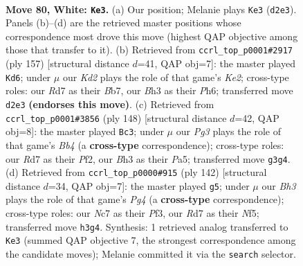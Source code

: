 \documentclass[11pt]{article}
\begin{document}
\clearpage

\begin{figure}[p]\centering
\begin{subfigure}{0.46\textwidth}\centering
\resizebox{\linewidth}{!}{%
\newchessgame
\chessboard[
  setfen={8/PbNR4/6k1/8/1p3P2/2n3PB/3K3P/8 w - - 28 80},
  showmover=false,
  pgfstyle=straightmove, color=movearrow, markmove={d2-e3}
]}
\caption{}
\end{subfigure}\hfill
\begin{subfigure}{0.46\textwidth}\centering
\resizebox{\linewidth}{!}{%
\newchessgame
\chessboard[
  setfen={8/Pb2k1p1/7p/7P/8/1P1B1r2/3K1p2/2R5 b - - 2 79},
  showmover=false,
  pgfstyle=straightmove, color=movearrow, markmove={e7-d6}
]}
\caption{}
\end{subfigure}
\\[4pt]
\begin{subfigure}{0.46\textwidth}\centering
\resizebox{\linewidth}{!}{%
\newchessgame
\chessboard[
  setfen={8/8/p1b1k3/P4p2/1B1P1K2/8/1P3P2/8 w - - 48 75},
  showmover=false,
  pgfstyle=straightmove, color=movearrow, markmove={b4-c3}
]}
\caption{}
\end{subfigure}\hfill
\begin{subfigure}{0.46\textwidth}\centering
\resizebox{\linewidth}{!}{%
\newchessgame
\chessboard[
  setfen={7r/5k2/3R1n2/5N2/1P4P1/3K1P2/2P5/8 w - - 3 72},
  showmover=false,
  pgfstyle=straightmove, color=movearrow, markmove={g4-g5}
]}
\caption{}
\end{subfigure}
\caption{\textbf{Move 80, White: \texttt{Ke3}.} (a) Our position; Melanie plays \texttt{Ke3} (\texttt{d2e3}). Panels (b)--(d) are the retrieved master positions whose correspondence most drove this move (highest QAP objective among those that transfer to it). (b) Retrieved from \texttt{ccrl\_top\_p0001\#2917} (ply 157) [structural distance $d$=41, QAP obj=7]: the master played \texttt{Kd6}; under $\mu$ our \emph{Kd2} plays the role of that game's \emph{Ke2}; cross-type roles: our \emph{R}d7 as their \emph{B}b7, our \emph{B}h3 as their \emph{P}h6; transferred move \texttt{d2e3} \textbf{(endorses this move)}. (c) Retrieved from \texttt{ccrl\_top\_p0001\#3856} (ply 148) [structural distance $d$=42, QAP obj=8]: the master played \texttt{Bc3}; under $\mu$ our \emph{Pg3} plays the role of that game's \emph{Bb4} (a \textbf{cross-type} correspondence); cross-type roles: our \emph{R}d7 as their \emph{P}f2, our \emph{B}h3 as their \emph{P}a5; transferred move \texttt{g3g4}. (d) Retrieved from \texttt{ccrl\_top\_p0000\#915} (ply 142) [structural distance $d$=34, QAP obj=7]: the master played \texttt{g5}; under $\mu$ our \emph{Bh3} plays the role of that game's \emph{Pg4} (a \textbf{cross-type} correspondence); cross-type roles: our \emph{N}c7 as their \emph{P}f3, our \emph{R}d7 as their \emph{N}f5; transferred move \texttt{h3g4}. Synthesis: 1 retrieved analog transferred to \texttt{Ke3} (summed QAP objective 7, the strongest correspondence among the candidate moves); Melanie committed it via the \texttt{search} selector.}
\label{fig:thought-m158}
\end{figure}
\end{document}

